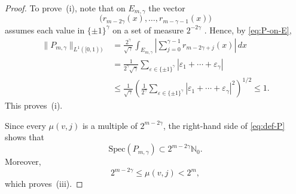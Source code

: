 \documentclass[11pt]{amsart}
\numberwithin{equation}{section}
\theoremstyle{plain}
\begin{document}
\begin{proof}
To prove~(i), note that on $E_{m,\gamma}$ the vector 
\begin{equation*}
\bigl(r_{m-2\gamma}(x),\dots,r_{m-\gamma-1}(x)\bigr)
\end{equation*}
assumes each value in $\{\pm1\}^{\gamma}$ on a set of measure $2^{-2\gamma}$%
. Hence, by \eqref{eq:P-on-E}, 
\begin{align*}
\|P_{m,\gamma}\|_{L^{1}([0,1))} &=\frac{2^{\gamma}}{\sqrt{\gamma}}%
\int_{E_{m,\gamma}} \left|\sum_{j=0}^{\gamma-1} r_{m-2\gamma+j}(x)\right|\,dx
\\
&=\frac{1}{2^{\gamma}\sqrt{\gamma}}\sum_{\varepsilon\in\{\pm1\}^{\gamma}}
|\varepsilon_1+\cdots+\varepsilon_{\gamma}| \\
&\le \frac{1}{\sqrt{\gamma}}\left(\frac{1}{2^{\gamma}}\sum_{\varepsilon\in\{%
\pm1\}^{\gamma}} |\varepsilon_1+\cdots+\varepsilon_{\gamma}|^2\right)^{1/2}
\le 1.
\end{align*}
This proves~(i).

Since every $\mu(v,j)$ is a multiple of $2^{m-2\gamma}$, the right-hand side
of \eqref{eq:def-P} shows that 
\begin{equation*}
\mathrm{Spec}(P_{m,\gamma})\subset 2^{m-2\gamma}\mathbb{N}_0.
\end{equation*}
Moreover, 
\begin{equation*}
2^{m-2\gamma}\le \mu(v,j)<2^m,
\end{equation*}
which proves~(iii).


\end{proof}
\end{document}
